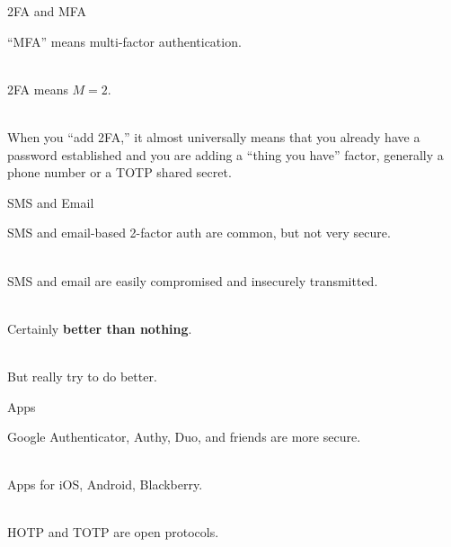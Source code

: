 \documentclass{beamer}
\begin{document}
\begin{frame}{2FA and MFA}

``MFA'' means multi-factor authentication.

\ \\

2FA means $M=2$.

\ \\

When you ``add 2FA,'' it almost universally means that you already have a password established and you are adding a ``thing you have'' factor, generally a phone number or a TOTP shared secret.

\end{frame}

\begin{frame}{SMS and Email}

SMS and email-based 2-factor auth are common, but not very secure.

\ \\

SMS and email are easily compromised and insecurely transmitted.

\ \\

Certainly \textbf{better than nothing}.

\ \\

But really try to do better.

\end{frame}

\begin{frame}{Apps}

Google Authenticator, Authy, Duo, and friends are more secure.

\ \\

Apps for iOS, Android, Blackberry.

\ \\

HOTP and TOTP are open protocols.

\end{frame}
\end{document}

